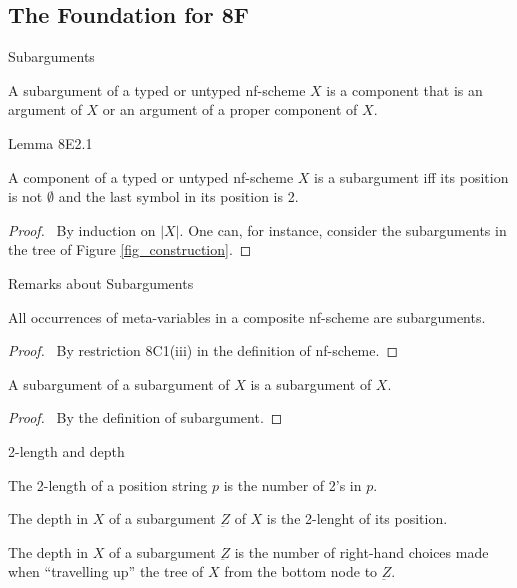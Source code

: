 \subsection{The Foundation for 8F}
\begin{frame}{Subarguments}
\begin{definition}[8E2 in Hindley's]
A subargument of a typed or untyped nf-scheme $X$ is a component that is an argument of $X$ or an argument of a proper component of $X$.
\end{definition}
\end{frame}

\begin{frame}{Lemma 8E2.1}
\begin{lemma}[8E2.1 in Hindley's]
A component  of a typed or untyped nf-scheme $X$ is a subargument iff 
its position is not $\emptyset$ and the last symbol in its position is 2. 
\end{lemma}

\begin{proof}
\pfsketch \ 
By induction on $|X|$. One can, for instance, consider the subarguments in the tree of Figure \ref{fig_construction}.
\end{proof}
\end{frame}

\begin{frame}{Remarks about Subarguments}
\begin{remark}[8E2.2(i) in Hindley's]
All occurrences of meta-variables in a composite nf-scheme are subarguments.
\begin{proof}
\pf \ By restriction 8C1(iii) in the definition of nf-scheme. 
\end{proof}
\end{remark}

\medskip

\begin{remark}[8E2.2(ii) in Hindley's]
A subargument of a subargument of $X$ is a subargument of $X$.
\begin{proof}
\pf \ By the definition of subargument. 
\end{proof}
\end{remark}
\end{frame}

\begin{frame} {2-length and depth}
\begin{mydef}[8E3 in Hindley's]
The 2-length of a position string $p$ is the number of 2's in $p$. 
\end{mydef} 

\medskip 
\begin{mydef}[8E3 in Hindley's]
The depth in $X$ of a subargument $\underbar{Z}$ of $X$ is the 2-lenght of its position. 
\end{mydef}

\begin{remark}[8E3 in Hindley's]
The depth in $X$ of a subargument $\underbar{Z}$ is the number of right-hand choices made when ``travelling up'' the tree of $X$ from the bottom node to $\underbar{Z}$.  
\end{remark}
\end{frame}


